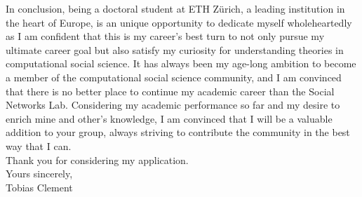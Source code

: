 In conclusion, being a doctoral student at ETH Zürich, a leading institution in the heart of Europe, is an unique opportunity to dedicate myself wholeheartedly as I am confident that this is my career's best turn to not only pursue my ultimate career goal but also satisfy my curiosity for understanding theories in computational social science. 
It has always been my age-long ambition to become a member of the computational social science community, and I am convinced that there is no better place to continue my academic career than the Social Networks Lab. 
Considering my academic performance so far and my desire to enrich mine and other's knowledge, I am convinced that I will be a valuable addition to your group, always striving to contribute the community in the best way that I can.\\

Thank you for considering my application.\\

Yours sincerely,\\
Tobias Clement\\\\\